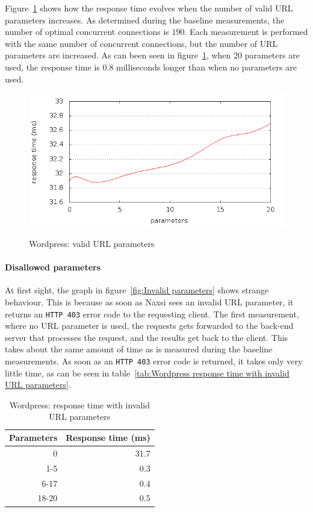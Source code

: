 \documentclass[Experiments]{subfiles}
\begin{document}
Figure~\ref{fig:wordpress_with_naxsi_valid_parameters} shows how the response time evolves when the number of valid \ac{URL} parameters increases. As determined during the baseline measurements, the number of optimal concurrent connections is $190$. Each measurement is performed with the same number of concurrent connections, but the number of \ac{URL} parameters are increased. As can been seen in figure~\ref{fig:wordpress_with_naxsi_valid_parameters}, when 20 parameters are used, the response time is $0.8$ milliseconds longer than when no parameters are used.

\begin{figure}[H]
\caption{Wordpress: valid URL parameters}
\centering
\includegraphics[scale=0.55] {images/results/wp_with_naxsi_incremented_allowed_parameters/output.png}
\label{fig:wordpress_with_naxsi_valid_parameters}
\end{figure}

\paragraph{Disallowed parameters}

At first sight, the graph in figure~\ref{fig:Invalid parameters} shows strange behaviour. This is because as soon as Naxsi sees an invalid \ac{URL} parameter, it returns an \verb+HTTP 403+ error code to the requesting client. The first measurement, where no \ac{URL} parameter is used, the requests gets forwarded to the back-end server that processes the request, and the results get back to the client. This takes about the same amount of time as is measured during the baseline measurements. As soon as an \verb+HTTP 403+ error code is returned, it takes only very little time, as can be seen in table~\ref{tab:Wordpress response time with invalid URL parameters}.

\begin{table}[H]
\caption{Wordpress: response time with invalid URL parameters}
\center
\begin{tabular}{|r|r|}
\hline
\textbf{Parameters} & \textbf{Response time (ms)}\\ \hline
0 & 31.7 \\ \hline
1-5 & 0.3 \\ \hline
6-17 & 0.4 \\ \hline
18-20 & 0.5 \\ \hline
\end{tabular}
\label{tab:Wordpress: response time with invalid URL parameters}
\end{table}
\end{document}
